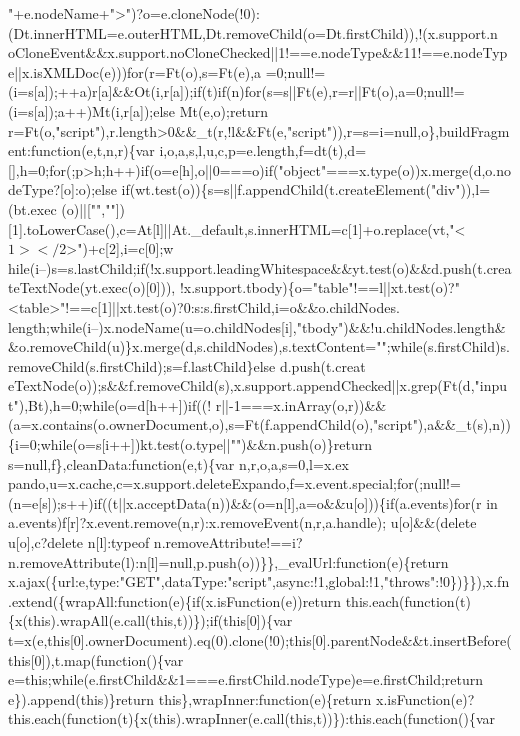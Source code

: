 \begin{DoxyCode}
{      "+e.nodeName+">")?o=e.cloneNode(!0):(Dt.innerHTML=e.outerHTML,Dt.removeChild(o=Dt.firstChild)),!(x.support.n
      oCloneEvent&&x.support.noCloneChecked||1!==e.nodeType&&11!==e.nodeType||x.isXMLDoc(e)))for(r=Ft(o),s=Ft(e),a
      =0;null!=(i=s[a]);++a)r[a]&&Ot(i,r[a]);if(t)if(n)for(s=s||Ft(e),r=r||Ft(o),a=0;null!=(i=s[a]);a++)Mt(i,r[a]);else Mt(e,o);return
       r=Ft(o,"script"),r.length>0&&\_t(r,!l&&Ft(e,"script")),r=s=i=null,o\},buildFragment:function(e,t,n,r)\{var
       i,o,a,s,l,u,c,p=e.length,f=dt(t),d=[],h=0;for(;p>h;h++)if(o=e[h],o||0===o)if("object"===x.type(o))x.merge(d,o.nodeType?[o]:o);else
       if(wt.test(o))\{s=s||f.appendChild(t.createElement("div")),l=(bt.exec
      (o)||["",""])[1].toLowerCase(),c=At[l]||At.\_default,s.innerHTML=c[1]+o.replace(vt,"<$1></$2>")+c[2],i=c[0];w
      hile(i--)s=s.lastChild;if(!x.support.leadingWhitespace&&yt.test(o)&&d.push(t.createTextNode(yt.exec(o)[0])),
      !x.support.tbody)\{o="table"!==l||xt.test(o)?"<table>"!==c[1]||xt.test(o)?0:s:s.firstChild,i=o&&o.childNodes.
      length;while(i--)x.nodeName(u=o.childNodes[i],"tbody")&&!u.childNodes.length&&o.removeChild(u)\}x.merge(d,s.childNodes),s.textContent="";while(s.firstChild)s.removeChild(s.firstChild);s=f.lastChild\}else
       d.push(t.creat
      eTextNode(o));s&&f.removeChild(s),x.support.appendChecked||x.grep(Ft(d,"input"),Bt),h=0;while(o=d[h++])if((!
      r||-1===x.inArray(o,r))&&(a=x.contains(o.ownerDocument,o),s=Ft(f.appendChild(o),"script"),a&&\_t(s),n))\{i=0;while(o=s[i++])kt.test(o.type||"")&&n.push(o)\}return s=null,f\},cleanData:function(e,t)\{var
       n,r,o,a,s=0,l=x.ex
      pando,u=x.cache,c=x.support.deleteExpando,f=x.event.special;for(;null!=(n=e[s]);s++)if((t||x.acceptData(n))&&(o=n[l],a=o&&u[o]))\{if(a.events)for(r in a.events)f[r]?x.event.remove(n,r):x.removeEvent(n,r,a.handle);}
\textcolor{stringliteral}{u[o]&&(delete u[o],c?delete n[l]:typeof
       n.removeAttribute!==i?n.removeAttribute(l):n[l]=null,p.push(o))\}\},\_evalUrl:function(e)\{return
       x.ajax(\{url:e,type:"GET",dataType:"script",async:!1,global:!1,"throws":!0\})\}\}),x.fn.extend(\{wrapAll:function(e)\{if(x.isFunction(e))return
       this.each(function(t)\{x(this).wrapAll(e.call(this,t))\});if(this[0])\{var
       t=x(e,this[0].ownerDocument).eq(0).clone(!0);this[0].parentNode&&t.insertBefore(this[0]),t.map(function()\{var e=this;while(e.firstChild&&1===e.firstChild.nodeType)e=e.firstChild;return
       e\}).append(this)\}return this\},wrapInner:function(e)\{return
       x.isFunction(e)?this.each(function(t)\{x(this).wrapInner(e.call(this,t))\}):this.each(function()\{var
}
\end{DoxyCode}
